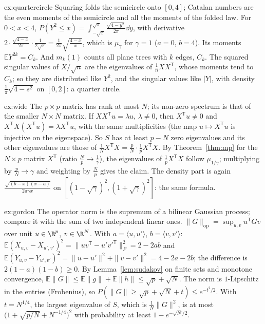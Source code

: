 \begin{solution}{ex:quartercircle}
\idea Squaring folds the semicircle onto $[0,4]$; Catalan numbers are the even moments of the semicircle and all the moments of the folded law.
\writeup For $0<x<4$, $P(Y^2\le x)=\int_{-\sqrt x}^{\sqrt x}\frac{\sqrt{4-y^2}}{2\pi}\dd y$, with derivative $2\cdot\frac{\sqrt{4-x}}{2\pi}\cdot\frac1{2\sqrt x}=\frac1{2\pi}\sqrt{\frac{4-x}x}$, which is $\mu_\gamma$ for $\gamma=1$ ($a=0$, $b=4$). Its moments
$\mathbb EY^{2k}=C_k$. And $m_k(1)$ counts all plane trees with $k$ edges, $C_k$. The squared singular values of $X/\sqrt n$ are the eigenvalues of $\frac1nXX^{\mathsf T}$, whose moments tend to $C_k$; so they are distributed like
$Y^2$, and the singular values like $|Y|$, with density $\frac1\pi\sqrt{4-s^2}$ on $[0,2]$: a quarter circle.
\end{solution}

\begin{solution}{ex:wide}
\idea The $p\times p$ matrix has rank at most $N$; its non-zero spectrum is that of the smaller $N\times N$ matrix.
\writeup If $XX^{\mathsf T}u=\lambda u$, $\lambda\ne0$, then $X^{\mathsf T}u\ne0$ and $X^{\mathsf T}X(X^{\mathsf T}u)=\lambda X^{\mathsf T}u$, with the same multiplicities (the map $u\mapsto X^{\mathsf T}u$ is injective on the eigenspace). So $S$ has at least
$p-N$ zero eigenvalues and its other eigenvalues are those of $\frac1NX^{\mathsf T}X=\frac pN\cdot\frac1pX^{\mathsf T}X$. By Theorem~\ref{thm:mp} for the $N\times p$ matrix $X^{\mathsf T}$ (ratio $\frac Np\to\frac1\gamma$), the eigenvalues of
$\frac1pX^{\mathsf T}X$ follow $\mu_{1/\gamma}$; multiplying by $\frac pN\to\gamma$ and weighting by $\frac Np$ gives the claim. The density part is again $\frac{\sqrt{(b-x)(x-a)}}{2\pi\gamma x}$ on $[(1-\sqrt\gamma)^2,(1+\sqrt\gamma)^2]$: the same formula.
\end{solution}

\begin{solution}{ex:gordon}
\idea The operator norm is the supremum of a bilinear Gaussian process; compare it with the sum of two independent linear ones.
\writeup $\|G\|_{\mathrm{op}}=\sup_{u,v}u^{\mathsf T}Gv$ over unit $u\in\R^p$, $v\in\R^N$. With $a=\langle u,u'\rangle$, $b=\langle v,v'\rangle$: $\mathbb E(X_{u,v}-X_{u',v'})^2=\|uv^{\mathsf T}-u'v'^{\mathsf T}\|_F^2=2-2ab$ and
$\mathbb E(Y_{u,v}-Y_{u',v'})^2=\|u-u'\|^2+\|v-v'\|^2=4-2a-2b$; the difference is $2(1-a)(1-b)\ge0$. By Lemma~\ref{lem:sudakov} on finite sets and monotone convergence, $\mathbb E\|G\|\le\mathbb E\|g\|+\mathbb E\|h\|\le\sqrt p+\sqrt N$. The norm is
$1$-Lipschitz in the entries (Frobenius), so $P(\|G\|\ge\sqrt p+\sqrt N+t)\le e^{-t^2/2}$. With $t=N^{1/4}$, the largest eigenvalue of $S$, which is $\frac1N\|G\|^2$, is at most $\bigl(1+\sqrt{p/N}+N^{-1/4}\bigr)^2$ with probability at least
$1-e^{-\sqrt N/2}$.
\end{solution}

